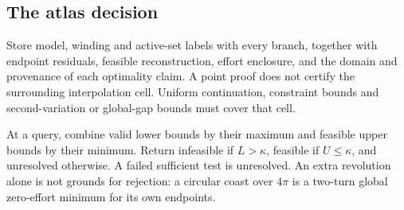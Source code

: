 \subsection{The atlas decision}
Store model, winding and active-set labels with every branch, together
with endpoint residuals, feasible reconstruction, effort enclosure,
and the domain and provenance of each optimality claim.
A point proof does not certify the surrounding interpolation cell.
Uniform continuation, constraint bounds and second-variation or
global-gap bounds must cover that cell.

At a query, combine valid lower bounds by their maximum and feasible
upper bounds by their minimum. Return infeasible if $L>\kappa$,
feasible if $U\le\kappa$, and unresolved otherwise.
A failed sufficient test is unresolved. An extra revolution alone is
not grounds for rejection: a circular coast over $4\pi$ is a two-turn
global zero-effort minimum for its own endpoints.
